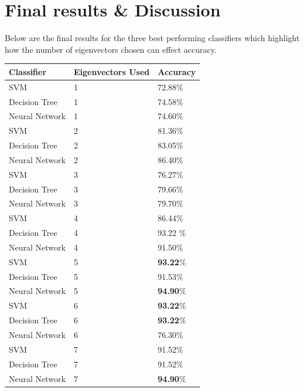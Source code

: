 \section {Final results \& Discussion}
Below are the final results for the three best performing classifiers which highlight how the number of eigenvectors chosen can effect accuracy.  
\begin{table}[h]
\begin{center}
    \begin{tabular}{ | l | l | l |}
    \hline
    Classifier & Eigenvectors Used & Accuracy\\ \hline
    SVM & 1 & 72.88\%\\ \hline
    Decision Tree & 1 & 74.58\%\\ \hline
    Neural Network & 1 & 74.60\%\\ \hline
    
    SVM & 2 & 81.36\%\\ \hline
    Decision Tree & 2 & 83.05\%\\ \hline
    Neural Network & 2 & 86.40\%\\ \hline
    
    SVM & 3 & 76.27\%\\ \hline
    Decision Tree & 3 & 79.66\%\\ \hline
    Neural Network & 3 & 79.70\%\\ \hline
    
    SVM & 4 & 86.44\%\\ \hline
    Decision Tree & 4 & 93.22 \%\\ \hline
    Neural Network & 4 & 91.50\%\\ \hline
    
    SVM & 5 & {\bf93.22}\%\\ \hline
    Decision Tree & 5 & 91.53\%\\ \hline
    Neural Network & 5 & {\bf94.90}\%\\ \hline
    
    SVM & 6 & {\bf93.22}\%\\ \hline
    Decision Tree & 6 & {\bf93.22}\%\\ \hline
    Neural Network & 6 & 76.30\%\\ \hline
    
    SVM & 7 & 91.52\%\\ \hline
    Decision Tree & 7 & 91.52\%\\ \hline
    Neural Network & 7 & {\bf94.90}\%\\ \hline
    \hline
    \end{tabular}
\end{center}
\end{table}

